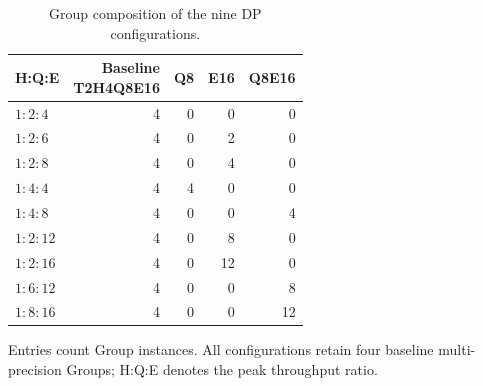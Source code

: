 \begin{table}[t]
\centering
\caption{Group composition of the nine DP configurations.}
\label{tab:ratio9_composition}
\begingroup
\footnotesize
\setlength{\tabcolsep}{3pt}
\begin{tabular*}{\columnwidth}{@{\extracolsep{\fill}}lrrrr@{}}
\toprule
H:Q:E & \shortstack{Baseline\\T2H4Q8E16} & Q8 & E16 & Q8E16 \\
\midrule
$1:2:4$  & 4 & 0 & 0  & 0  \\
$1:2:6$  & 4 & 0 & 2  & 0  \\
$1:2:8$  & 4 & 0 & 4  & 0  \\
$1:4:4$  & 4 & 4 & 0  & 0  \\
$1:4:8$  & 4 & 0 & 0  & 4  \\
$1:2:12$ & 4 & 0 & 8  & 0  \\
$1:2:16$ & 4 & 0 & 12 & 0  \\
$1:6:12$ & 4 & 0 & 0  & 8  \\
$1:8:16$ & 4 & 0 & 0  & 12 \\
\bottomrule
\end{tabular*}
\par\smallskip
\parbox{\columnwidth}{\raggedright
Entries count Group instances. All configurations retain four baseline
multi-precision Groups; H:Q:E denotes the peak throughput ratio.}
\endgroup
\end{table}
